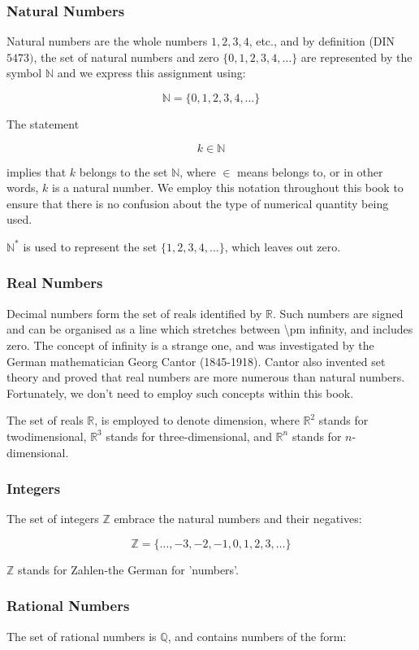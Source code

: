 \documentclass[10pt]{article}
\begin{document}
\subsubsection{Natural Numbers}
Natural numbers are the whole numbers $1,2,3,4$, etc., and by definition (DIN $5473)$, the set of natural numbers and zero $\{0,1,2,3,4, \ldots\}$ are represented by the symbol $\mathbb{N}$ and we express this assignment using:

$$
\mathbb{N}=\{0,1,2,3,4, \ldots\}
$$

The statement

$$
k \in \mathbb{N}
$$

implies that $k$ belongs to the set $\mathbb{N}$, where $\in$ means belongs to, or in other words, $k$ is a natural number. We employ this notation throughout this book to ensure that there is no confusion about the type of numerical quantity being used.

$\mathbb{N}^{*}$ is used to represent the set $\{1,2,3,4, \ldots\}$, which leaves out zero.

\subsubsection{Real Numbers}
Decimal numbers form the set of reals identified by $\mathbb{R}$. Such numbers are signed and can be organised as a line which stretches between \textbackslash pm infinity, and includes zero. The concept of infinity is a strange one, and was investigated by the German mathematician Georg Cantor (1845-1918). Cantor also invented set theory and proved that real numbers are more numerous than natural numbers. Fortunately, we don't need to employ such concepts within this book.

The set of reals $\mathbb{R}$, is employed to denote dimension, where $\mathbb{R}^{2}$ stands for twodimensional, $\mathbb{R}^{3}$ stands for three-dimensional, and $\mathbb{R}^{n}$ stands for $n$-dimensional.

\subsubsection{Integers}
The set of integers $\mathbb{Z}$ embrace the natural numbers and their negatives:

$$
\mathbb{Z}=\{\ldots,-3,-2,-1,0,1,2,3, \ldots\}
$$

$\mathbb{Z}$ stands for Zahlen-the German for 'numbers'.

\subsubsection{Rational Numbers}
The set of rational numbers is $\mathbb{Q}$, and contains numbers of the form:
\end{document}
